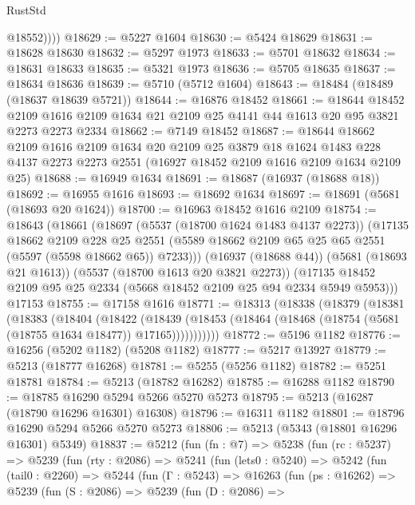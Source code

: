 \begin{lexlean}{RustStd}
\begin{coremodule}
            @18552))))
@18629 := @5227 @1604
@18630 := @5424 @18629
@18631 := @18628 @18630
@18632 := @5297 @1973
@18633 := @5701 @18632
@18634 := @18631 @18633
@18635 := @5321 @1973
@18636 := @5705 @18635
@18637 := @18634 @18636
@18639 := @5710 (@5712 @1604)
@18643 := @18484 (@18489 (@18637 @18639 @5721))
@18644 := @16876 @18452
@18661 := @18644
    @18452
    @2109
    @1616
    @2109
    @1634
    @21
    @2109
    @25
    @4141
    @44
    @1613
    @20
    @95
    @3821
    @2273
    @2273
    @2334
@18662 := @7149 @18452
@18687 := @18644
    @18662
    @2109
    @1616
    @2109
    @1634
    @20
    @2109
    @25
    @3879
    @18
    @1624
    @1483
    @228
    @4137
    @2273
    @2273
    @2551
    (@16927 @18452 @2109 @1616 @2109 @1634 @2109 @25)
@18688 := @16949 @1634
@18691 := @18687 (@16937 (@18688 @18))
@18692 := @16955 @1616
@18693 := @18692 @1634
@18697 := @18691 (@5681 (@18693 @20 @1624))
@18700 := @16963 @18452 @1616 @2109
@18754 := @18643
    (@18661
      (@18697
        (@5537 (@18700 @1624 @1483 @4137 @2273))
        (@17135
          @18662
          @2109
          @228
          @25
          @2551
          (@5589 @18662 @2109 @65 @25 @65 @2551 (@5597 (@5598 @18662 @65)) @7233)))
      (@16937 (@18688 @44))
      (@5681 (@18693 @21 @1613))
      (@5537 (@18700 @1613 @20 @3821 @2273))
      (@17135 @18452 @2109 @95 @25 @2334 (@5668 @18452 @2109 @25 @94 @2334 @5949 @5953)))
    @17153
@18755 := @17158 @1616
@18771 := @18313
    (@18338
      (@18379
        (@18381
          (@18383
            (@18404
              (@18422
                (@18439
                  (@18453 (@18464 (@18468 (@18754 (@5681 (@18755 @1634 @18477)) @17165)))))))))))
@18772 := @5196 @1182
@18776 := @16256 (@5202 @1182) (@5208 @1182)
@18777 := @5217 @13927
@18779 := @5213 (@18777 @16268)
@18781 := @5255 (@5256 @1182)
@18782 := @5251 @18781
@18784 := @5213 (@18782 @16282)
@18785 := @16288 @1182
@18790 := @18785 @16290 @5294 @5266 @5270 @5273
@18795 := @5213 (@16287 (@18790 @16296 @16301) @16308)
@18796 := @16311 @1182
@18801 := @18796 @16290 @5294 @5266 @5270 @5273
@18806 := @5213 (@5343 (@18801 @16296 @16301) @5349)
@18837 := @5212
    (fun (fn : @7) =>
    @5238
      (fun (rc : @5237) =>
      @5239
        (fun (rty : @2086) =>
        @5241
          (fun (lets0 : @5240) =>
          @5242
            (fun (tail0 : @2260) =>
            @5244
              (fun (Γ : @5243) =>
              @16263
                (fun (ps : @16262) =>
                @5239
                  (fun (S : @2086) =>
                  @5239
                    (fun (D : @2086) =>

\end{coremodule}
\end{lexlean}
